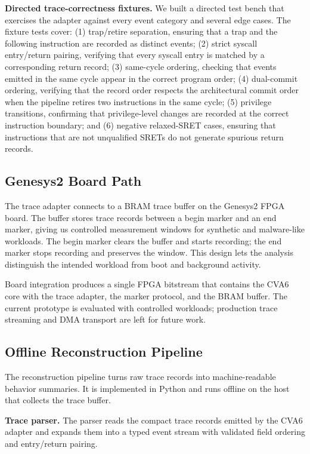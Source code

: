 \textbf{Directed trace-correctness fixtures.}
We built a directed test bench that exercises the adapter against every event category and several edge cases. The fixture tests cover: (1) trap/retire separation, ensuring that a trap and the following instruction are recorded as distinct events; (2) strict syscall entry/return pairing, verifying that every syscall entry is matched by a corresponding return record; (3) same-cycle ordering, checking that events emitted in the same cycle appear in the correct program order; (4) dual-commit ordering, verifying that the record order respects the architectural commit order when the pipeline retires two instructions in the same cycle; (5) privilege transitions, confirming that privilege-level changes are recorded at the correct instruction boundary; and (6) negative relaxed-SRET cases, ensuring that instructions that are not unqualified SRETs do not generate spurious return records.

\subsection{Genesys2 Board Path}
\label{subsec:board-path}

The trace adapter connects to a BRAM trace buffer on the Genesys2 FPGA board. The buffer stores trace records between a begin marker and an end marker, giving us controlled measurement windows for synthetic and malware-like workloads. The begin marker clears the buffer and starts recording; the end marker stops recording and preserves the window. This design lets the analysis distinguish the intended workload from boot and background activity.

Board integration produces a single FPGA bitstream that contains the CVA6 core with the trace adapter, the marker protocol, and the BRAM buffer. The current prototype is evaluated with controlled workloads; production trace streaming and DMA transport are left for future work.

\subsection{Offline Reconstruction Pipeline}
\label{subsec:reconstruction-pipeline}

The reconstruction pipeline turns raw trace records into machine-readable behavior summaries. It is implemented in Python and runs offline on the host that collects the trace buffer.

\textbf{Trace parser.} The parser reads the compact trace records emitted by the CVA6 adapter and expands them into a typed event stream with validated field ordering and entry/return pairing.

